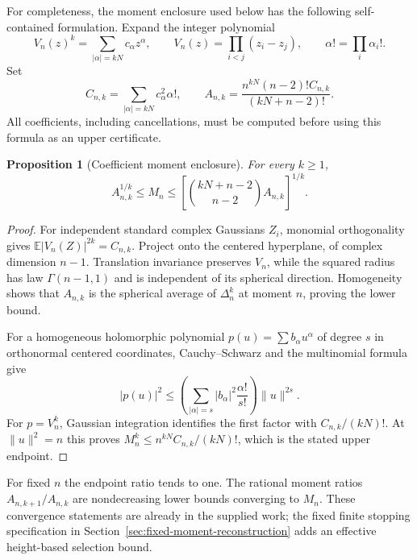 \documentclass[11pt]{article}
\newtheorem{proposition}[theorem]{Proposition}
\theoremstyle{remark}
\numberwithin{equation}{section}
\begin{document}
For completeness, the moment enclosure used below has the following
self-contained formulation. Expand the integer polynomial
\[
V_n(z)^k=\sum_{|\alpha|=kN}c_\alpha z^\alpha,
\qquad V_n(z)=\prod_{i<j}(z_i-z_j),
\qquad \alpha!=\prod_i\alpha_i!.
\]
Set
\begin{equation}\label{eq:coefficient-moment}
C_{n,k}=\sum_{|\alpha|=kN}c_\alpha^2\alpha!,\qquad
A_{n,k}=\frac{n^{kN}(n-2)!C_{n,k}}{(kN+n-2)!}.
\end{equation}
All coefficients, including cancellations, must be computed before
using this formula as an upper certificate.

\begin{proposition}[Coefficient moment enclosure]
For every $k\ge1$,
\begin{equation}\label{eq:moment-enclosure}
A_{n,k}^{1/k}\le M_n\le
\left[\binom{kN+n-2}{n-2}A_{n,k}\right]^{1/k}.
\end{equation}
\end{proposition}
\begin{proof}
For independent standard complex Gaussians $Z_i$, monomial orthogonality
gives $\mathbb E|V_n(Z)|^{2k}=C_{n,k}$. Project onto the centered
hyperplane, of complex dimension $n-1$. Translation invariance
preserves $V_n$, while the squared radius has law $\Gamma(n-1,1)$
and is independent of its spherical direction. Homogeneity shows that
$A_{n,k}$ is the spherical average of $\Delta_n^k$ at moment $n$,
proving the lower bound.

For a homogeneous holomorphic polynomial $p(u)=\sum b_\alpha u^\alpha$
of degree $s$ in orthonormal centered coordinates, Cauchy--Schwarz and
the multinomial formula give
\[
|p(u)|^2\le
\left(\sum_{|\alpha|=s}|b_\alpha|^2\frac{\alpha!}{s!}\right)
\|u\|^{2s}.
\]
For $p=V_n^k$, Gaussian integration identifies the first factor with
$C_{n,k}/(kN)!$. At $\|u\|^2=n$ this proves
$M_n^k\le n^{kN}C_{n,k}/(kN)!$, which is the stated upper endpoint.
\end{proof}

For fixed $n$ the endpoint ratio tends to one. The rational moment
ratios $A_{n,k+1}/A_{n,k}$ are nondecreasing lower bounds converging
to $M_n$. These convergence statements are already in the supplied
work; the fixed finite stopping specification in Section~\ref{sec:fixed-moment-reconstruction}
adds an effective height-based selection bound.
\end{document}
